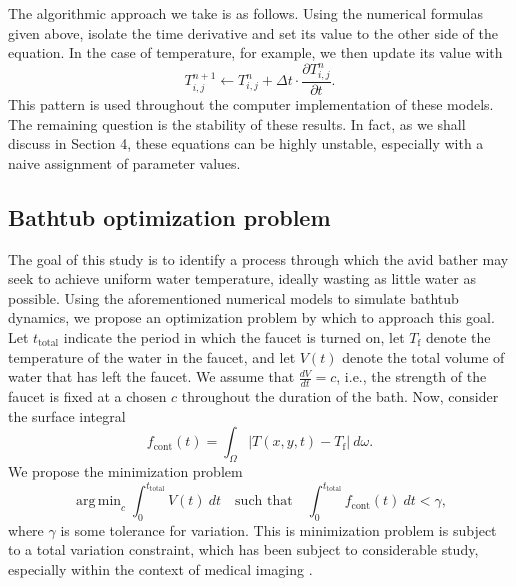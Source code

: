 \documentclass[12pt]{article}
\newcommand{\abs}[1]{\left|#1\right|}
\DeclareMathOperator*{\argmin}{\mathrm{arg\,min}}
\begin{document}
The algorithmic approach we take is as follows. Using the numerical formulas
given above, isolate the time derivative and set its value to the other side of
the equation. In the case of temperature, for example, we then update its value
with
\begin{equation}
    T_{i,j}^{n+1} \leftarrow T_{i,j}^{n} + \Delta t \cdot \frac{\partial
        T_{i,j}^n}{\partial t}.
    \label{eq:\theequation}
\end{equation}
This pattern is used throughout the computer implementation of these models. The
remaining question is the stability of these results. In fact, as we shall
discuss in Section 4, these equations can be highly unstable, especially with a
naive assignment of parameter values.



\subsection{Bathtub optimization problem}

The goal of this study is to identify a process through which the avid bather
may seek to achieve uniform water temperature, ideally wasting as little water
as possible. Using the aforementioned numerical models to simulate bathtub
dynamics, we propose an optimization problem by which to approach this goal. Let
$t_{\mathrm{total}}$ indicate the period in which the faucet is turned on, let
$T_{\mathrm{f}}$ denote the temperature of the water in the faucet, and let
$V(t)$ denote the total volume of water that has left the faucet. We assume that
$\frac{dV}{dt} = c$, i.e., the strength of the faucet is fixed at a chosen $c$ throughout the
duration of the bath. Now, consider the surface integral
\begin{equation}
    f_{\mathrm{cont}}(t) = \int_{\Omega} \abs{T(x,y,t) - T_{\mathrm{f}}} \ d\omega.
    \label{eq:\theequation}
\end{equation}
We propose the minimization problem
\begin{equation}
    \argmin_{c} \int_{0}^{t_{\mathrm{total}}} V(t) \ dt \quad \text{such that}
    \quad \int_{0}^{t_{\mathrm{total}}} f_{\mathrm{cont}}(t) \ dt < \gamma,
    \label{eq:\theequation}
\end{equation}
where $\gamma$ is some tolerance for variation. This is minimization
problem is subject to a total variation constraint, which has been subject to
considerable study, especially within the context of medical imaging
\cite{Zhang2005}.
\end{document}
